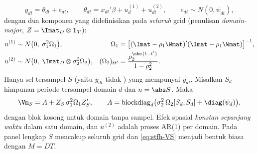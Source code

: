 \begin{equation}
  y_{dt}=\theta_{dt}+e_{dt},\qquad
  \theta_{dt}=x_{dt}'\beta+u^{(1)}_d+u^{(2)}_{dt},
  \qquad e_{dt}\sim N(0,\psi_{dt}),
  \label{eq:stfh-model}
\end{equation}
dengan dua komponen yang didefinisikan pada \emph{seluruh} grid (penulisan
\emph{domain-major}, $Z=\Imat_D\otimes\mathbf 1_T$):
\begin{align}
  u^{(1)} &\sim N\bigl(0,\;\sigma_1^2\Omega_1\bigr),
    &\Omega_1&=\bigl[(\Imat-\rho_1\Wmat)'(\Imat-\rho_1\Wmat)\bigr]^{-1},
    \label{eq:stfh-spatial}\\
  u^{(2)} &\sim N\bigl(0,\;\Imat_D\otimes\sigma_2^2\Omega_2\bigr),
    &(\Omega_2)_{tt'}&=\frac{\rho_2^{\abs{t-t'}}}{1-\rho_2^2}.
    \label{eq:stfh-temporal}
\end{align}
Hanya sel tersampel $S$ (yaitu $y_{dt}$ tidak ) yang mempunyai
$y_{dt}$. Misalkan $S_d$ himpunan periode tersampel domain $d$ dan
$n=\abs S$. Maka
\begin{equation}
  \Vm_S=A+Z_S\,\sigma_1^2\Omega_1Z_S',\qquad
  A=\mathrm{blockdiag}_d\bigl(\sigma_2^2\,\Omega_2[S_d,S_d]+\diag(\psi_d)\bigr),
  \label{eq:stfh-VS}
\end{equation}
dengan blok kosong untuk domain tanpa sampel. Efek spasial \emph{konstan
sepanjang waktu} dalam satu domain, dan $u^{(2)}$ adalah proses AR(1) per
domain. Pada panel lengkap $S$ mencakup seluruh grid dan
\eqref{eq:stfh-VS} menjadi bentuk biasa dengan $M=DT$.


